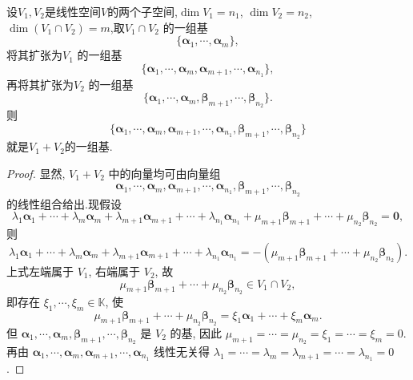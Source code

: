 \documentclass[../../main.tex]{subfiles}%
\begin{document}
\begin{corollary}\label{corollary:空间分解关于基的结论}
设\(V_1,V_2\)是线性空间\(V\)的两个子空间,$\dim V_1 = n_1$, $\dim V_2 = n_2$, $\dim(V_1 \cap V_2) = m$,取$V_1 \cap V_2$ 的一组基$$\{\boldsymbol{\alpha}_1, \cdots, \boldsymbol{\alpha}_m\},$$将其扩张为$V_1$ 的一组基$$\{\boldsymbol{\alpha}_1, \cdots, \boldsymbol{\alpha}_m, \boldsymbol{\alpha}_{m + 1}, \cdots, \boldsymbol{\alpha}_{n_1}\},$$
再将其扩张为$V_2$ 的一组基$$\{\boldsymbol{\alpha}_1, \cdots, \boldsymbol{\alpha}_m, \boldsymbol{\beta}_{m + 1}, \cdots, \boldsymbol{\beta}_{n_2}\}.$$
则
$$
\{\boldsymbol{\alpha}_1, \cdots, \boldsymbol{\alpha}_m, \boldsymbol{\alpha}_{m + 1}, \cdots, \boldsymbol{\alpha}_{n_1}, \boldsymbol{\beta}_{m + 1}, \cdots, \boldsymbol{\beta}_{n_2}\}
$$
就是$V_1+V_2$的一组基.
\end{corollary}
\begin{proof}

显然, $V_1 + V_2$ 中的向量均可由向量组
$$
\boldsymbol{\alpha}_1, \cdots, \boldsymbol{\alpha}_m, \boldsymbol{\alpha}_{m + 1}, \cdots, \boldsymbol{\alpha}_{n_1}, \boldsymbol{\beta}_{m + 1}, \cdots, \boldsymbol{\beta}_{n_2}
$$
的线性组合给出.现假设
$$
\lambda_1\boldsymbol{\alpha}_1 + \cdots + \lambda_m\boldsymbol{\alpha}_m + \lambda_{m + 1}\boldsymbol{\alpha}_{m + 1} + \cdots + \lambda_{n_1}\boldsymbol{\alpha}_{n_1} + \mu_{m + 1}\boldsymbol{\beta}_{m + 1} + \cdots + \mu_{n_2}\boldsymbol{\beta}_{n_2} = \boldsymbol{0},
$$
则
$$
\lambda_1\boldsymbol{\alpha}_1 + \cdots + \lambda_m\boldsymbol{\alpha}_m + \lambda_{m + 1}\boldsymbol{\alpha}_{m + 1} + \cdots + \lambda_{n_1}\boldsymbol{\alpha}_{n_1} = -(\mu_{m + 1}\boldsymbol{\beta}_{m + 1} + \cdots + \mu_{n_2}\boldsymbol{\beta}_{n_2}).
$$
上式左端属于 $V_1$, 右端属于 $V_2$, 故
$$
\mu_{m + 1}\boldsymbol{\beta}_{m + 1} + \cdots + \mu_{n_2}\boldsymbol{\beta}_{n_2} \in V_1 \cap V_2,
$$
即存在 $\xi_1, \cdots, \xi_m \in \mathbb{K}$, 使
$$
\mu_{m + 1}\boldsymbol{\beta}_{m + 1} + \cdots + \mu_{n_2}\boldsymbol{\beta}_{n_2} = \xi_1\boldsymbol{\alpha}_1 + \cdots + \xi_m\boldsymbol{\alpha}_m.
$$
但 $\boldsymbol{\alpha}_1, \cdots, \boldsymbol{\alpha}_m, \boldsymbol{\beta}_{m + 1}, \cdots, \boldsymbol{\beta}_{n_2}$ 是 $V_2$ 的基, 因此 $\mu_{m + 1} = \cdots = \mu_{n_2} = \xi_1 = \cdots = \xi_m = 0$. 再由 $\boldsymbol{\alpha}_1, \cdots, \boldsymbol{\alpha}_m, \boldsymbol{\alpha}_{m + 1}, \cdots, \boldsymbol{\alpha}_{n_1}$ 线性无关得 $\lambda_1 = \cdots = \lambda_m = \lambda_{m + 1} = \cdots = \lambda_{n_1} = 0$. 

\end{proof}
\end{document}
